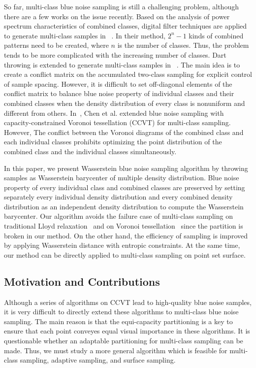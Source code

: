 So far, multi-class blue noise sampling is still a challenging problem,
although there are a few works on the issue recently.
Based on the analysis of power spectrum characteristics of combined classes,
digital filter techniques are applied to generate multi-class samples in ~\cite{Wang:1999:BlueNoise}.
In their method, $2^n-1$ kinds of combined patterns need to be created,
where $n$ is the number of classes.
Thus, the problem tends to be more complicated with the increasing number of classes.
Dart throwing is extended to generate multi-class samples in ~\cite{wei:2010:multi}.
The main idea is to create a conflict matrix on the accumulated two-class sampling for explicit control of sample spacing.
However, it is  difficult to set off-diagonal elements of the conflict matrix
to balance blue noise property of  individual classes and their combined classes
when the density distribution of every class is nonuniform and different from others.
In~\cite{chen:2012:variational},
Chen et al. extended blue noise sampling with capacity-constrained
Voronoi tessellation (CCVT) for multi-class sampling.
However,
The conflict between the Voronoi diagrams of the combined class and  each individual classes
prohibits  optimizing the point distribution of
the combined class and the individual classes simultaneously.


In this paper, we present Wasserstein blue noise sampling algorithm by
throwing samples as Wasserstein barycenter of multiple density distribution.
Blue noise property of every individual class and combined classes
are preserved by setting separately every individual density distribution and every combined density distribution as an independent density distribution to
compute the Wasserstein barycenter.
Our algorithm avoids the failure case of multi-class sampling on traditional Lloyd relaxation~\cite{wei:2010:multi}
 and on Voronoi tessellation~\cite{chen:2012:variational}  since
 the partition is broken in our method.
On the other hand,
the efficiency of sampling is improved by applying Wasserstein distance with entropic constraints.
At the same time,
our method can be directly applied to multi-class sampling on point set surface.

\subsection{Motivation and Contributions}
Although a series of algorithms on CCVT lead to high-quality blue noise samples,
it is very difficult to directly extend these algorithms to multi-class blue noise sampling.
The main reason is that the equi-capacity partitioning is a key  to
ensure that each point conveyes equal visual importance in these algorithms.
It is questionable whether an adaptable partitioning for multi-class sampling can be made.
Thus, we must study a more general algorithm which is feasible for multi-class sampling,
adaptive sampling, and surface sampling.

